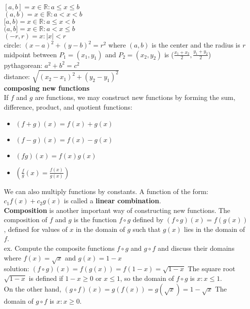\documentclass{article}
\begin{document}
$[a, b] = {x \in \mathbb{R} : a \leq x \leq b}$\\
$(a, b) = {x \in \mathbb{R} : a < x < b}$\\
$[a, b) = {x \in \mathbb{R} : a \leq x < b}$\\
$(a, b] = {x \in \mathbb{R} : a < x \leq b}$\\
$(-r, r) = {x : \lvert x\rvert < r}$\\

circle: $(x-a)^2 + (y-b)^2 = r^2$ where $(a, b)$ is the center and the radius is $r$\\
midpoint between $P_1 = (x_1, y_1)$ and $P_2 = (x_2, y_2)$ is ($\frac{x_1 + x_2}{2} , \frac{y_1 + y_2}{2}$)\\
pythagorean: $a^2 + b^2 = c^2$\\
distance: $\sqrt{(x_2 - x_1)^2 + (y_2 - y_1)^2}$\\

\textbf{composing new functions}\\
	If $f$ and $g$ are functions, we may construct new functions by forming the sum, difference, product, and quotient functions:\\
	\begin{itemize}
		\item $(f + g)(x) = f(x) + g(x)$
		\item $(f - g)(x) = f(x) - g(x)$
		\item $(fg)(x) = f(x)g(x)$
		\item $(\frac{f}{g}(x) = \frac{f(x)}{g(x)})$
	\end{itemize}
	We can also multiply functions by constants. A function of the form: $c_1f(x) + c_2g(x)$ is called a \textbf{linear combination}.\\
	\textbf{Composition} is another important way of constructing new functions. The composition of $f$ and $g$ is the function $f \circ g$ defined by $(f \circ g)(x) = f(g(x))$, defined for values of $x$ in the domain of $g$ such that $g(x)$ lies in the domain of $f$.\\
	ex. Compute the composite functions $f \circ g$ and $g \circ f$ and discuss their domains where $f(x) = \sqrt{x}$ and $g(x) = 1 - x$\\
	solution: $(f \circ g)(x) = f(g(x)) = f(1 - x) = \sqrt{1 - x}$ The square root $\sqrt{1 - x}$ is defined if $1 - x \geq 0$ or $x \leq 1$, so the domain of $f \circ g$ is ${x : x \leq 1}$.\\
	On the other hand, $(g \circ f)(x) = g(f(x)) = g(\sqrt{x}) = 1 - \sqrt{x}$ The domain of $g \circ f$ is ${x : x \geq 0}$.\\
\end{document}
